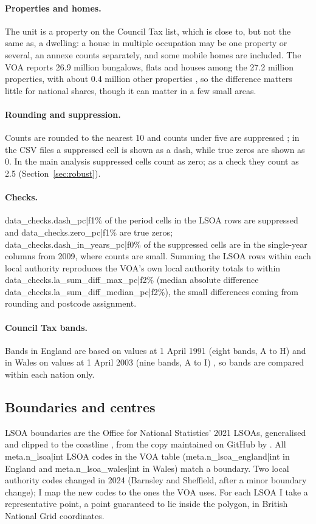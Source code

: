 \paragraph{Properties and homes.} The unit is a property on the Council Tax list, which is close to, but not the same as, a dwelling: a house in multiple occupation may be one property or several, an annexe counts separately, and some mobile homes are included. The VOA reports 26.9 million bungalows, flats and houses among the 27.2 million properties, with about 0.4 million other properties \citep{voa2025com}, so the difference matters little for national shares, though it can matter in a few small areas.

\paragraph{Rounding and suppression.} Counts are rounded to the nearest 10 and counts under five are suppressed \citep{voa2025bg}; in the CSV files a suppressed cell is shown as a dash, while true zeros are shown as 0. In the main analysis suppressed cells count as zero; as a check they count as 2.5 (Section~\ref{sec:robust}).

\paragraph{Checks.} {{data_checks.dash_pc|f1}}\% of the period cells in the LSOA rows are suppressed and {{data_checks.zero_pc|f1}}\% are true zeros; {{data_checks.dash_in_years_pc|f0}}\% of the suppressed cells are in the single-year columns from 2009, where counts are small. Summing the LSOA rows within each local authority reproduces the VOA's own local authority totals to within {{data_checks.la_sum_diff_max_pc|f2}}\% (median absolute difference {{data_checks.la_sum_diff_median_pc|f2}}\%), the small differences coming from rounding and postcode assignment.

\paragraph{Council Tax bands.} Bands in England are based on values at 1 April 1991 (eight bands, A to H) and in Wales on values at 1 April 2003 (nine bands, A to I) \citep{voa2025bg}, so bands are compared within each nation only.

\subsection{Boundaries and centres}
LSOA boundaries are the Office for National Statistics' 2021 LSOAs, generalised and clipped to the coastline \citep{ons2021lsoa}, from the copy maintained on GitHub by \citet{kane2026}. All {{meta.n_lsoa|int}} LSOA codes in the VOA table ({{meta.n_lsoa_england|int}} in England and {{meta.n_lsoa_wales|int}} in Wales) match a boundary. Two local authority codes changed in 2024 (Barnsley and Sheffield, after a minor boundary change); I map the new codes to the ones the VOA uses. For each LSOA I take a representative point, a point guaranteed to lie inside the polygon, in British National Grid coordinates.

